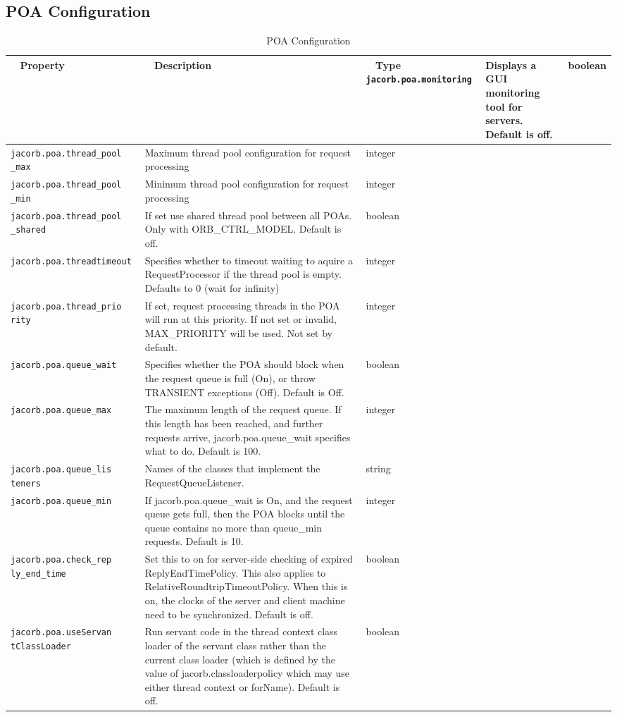 \subsection{POA Configuration}
\begin{small}
\begin{longtable}{|p{5cm}|p{9cm}|p{2cm}|}
\caption{POA Configuration}\\
\hline
~ \hfill \textbf {Property} \hfill ~ & ~ \hfill \textbf {Description} \hfill ~ & ~ \hfill \textbf {Type} \hfill ~ \endhead
\hline
\verb"jacorb.poa.monitoring" & Displays a GUI monitoring tool for servers. Default is off. & boolean \\
\hline
\verb"jacorb.poa.thread_pool"
\verb"_max" & Maximum thread pool configuration for request processing & integer \\
\hline
\verb"jacorb.poa.thread_pool"
\verb"_min" & Minimum thread pool configuration for request processing & integer \\
\hline
\verb"jacorb.poa.thread_pool"
\verb"_shared" & If set use shared thread pool between all POAs. Only with
ORB\_CTRL\_MODEL. Default is off. & boolean \\
\hline
\verb"jacorb.poa.threadtimeout" & Specifies whether to timeout waiting to aquire a RequestProcessor if the thread pool is empty. Defaults to 0 (wait for infinity) & integer \\
\hline
\verb"jacorb.poa.thread_prio"
\verb"rity" & If set, request processing threads in the POA will run at this priority. If not set or invalid, MAX\_PRIORITY will be used. Not set by default. & integer \\
\hline
\verb"jacorb.poa.queue_wait" & Specifies whether the POA should block
when the request queue is full (On), or throw TRANSIENT exceptions
(Off). Default is Off. & boolean\\
\hline
\verb"jacorb.poa.queue_max" & The maximum length of the request
queue.  If this length has been reached, and further requests arrive,
jacorb.poa.queue\_wait specifies what to do. Default is 100. & integer \\
\hline
\verb"jacorb.poa.queue_lis"
\verb"teners" & Names of the classes that implement the RequestQueueListener. & string \\
\hline
\verb"jacorb.poa.queue_min" & If jacorb.poa.queue\_wait is On, and the
request queue gets full, then the POA blocks until the queue contains
no more than queue\_min requests. Default is 10. & integer \\
\hline
\verb"jacorb.poa.check_rep"
\verb"ly_end_time" & Set this to on for server-side checking of expired
ReplyEndTimePolicy. This also applies to RelativeRoundtripTimeoutPolicy.
When this is on, the clocks of the server and client machine need to be
synchronized. Default is off. & boolean\\
\hline
\verb"jacorb.poa.useServan"
\verb"tClassLoader" & Run servant code in the thread context class loader of
the servant class rather than the current class loader (which is
defined by the value of jacorb.classloaderpolicy which may use either thread
context or forName). Default is off. & boolean\\
\hline


\end{longtable}
\end{small}
